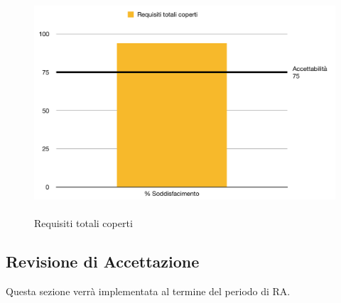 \begin{minipage}[t]{0.25\textwidth}
	\begin{figure}[H]
		\includegraphics[scale=0.3]{./images/grafici_RQ/reqTotCop.png} 
		\caption{\-\\Requisiti totali coperti}
	\end{figure}
\end{minipage}





\subsection{Revisione di Accettazione}
Questa sezione verrà implementata al termine del periodo di RA.

